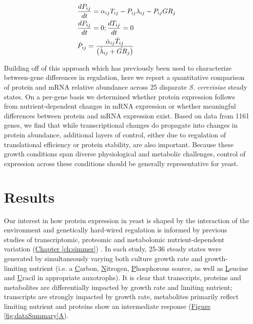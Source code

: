 \begin{align}
&\frac{dP_{ij}}{dt} = \alpha_{ij}T_{ij} - P_{ij}\lambda_{ij} - P_{ij}GR_{j}\notag\\
&\frac{dP_{ij}}{dt} = 0 ; \frac{dT_{ij}}{dt} = 0 \notag\\
&\dot{P}_{ij} = \frac{\dot{\alpha}_{ij}\dot{T}_{ij}}{\left(\dot{\lambda}_{ij} + \dot{GR}_{j}\right)}\label{steady_expression}
\end{align}


Building off of this approach which has previously been used to characterize between-gene differences in regulation, here we report a quantitative comparison of protein and mRNA relative abundance across 25 disparate \textit{S. cerevisiae} steady states.  On a per-gene basis we determined whether protein expression follows from nutrient-dependent changes in mRNA expression or whether meaningful differences between protein and mRNA expression exist.  Based on data from 1161 genes, we find that while transcriptional changes do propagate into changes in protein abundance, additional layers of control, either due to regulation of translational efficiency or protein stability, are also important. Because these growth conditions span diverse physiological and metabolic challenges, control of expression across these conditions should be generally representative for yeast.

\section{Results}

Our interest in how protein expression in yeast is shaped by the interaction of the environment and genetically hard-wired regulation is informed by previous studies of transcriptomic, proteomic and metabolomic nutrient-dependent variation (\hyperref[ch:simmer]{Chapter \ref{ch:simmer}}) \cite{Brauer:2008jn, Boer:2010fb}. In each study, 25-36 steady states were generated by simultaneously varying both culture growth rate and growth-limiting nutrient (i.e. a \underline{C}arbon, \underline{N}itrogen, \underline{P}hosphorous source, as well as \underline{L}eucine and \underline{U}racil in appropriate auxotrophs). It is clear that transcripts, proteins and metabolites are differentially impacted by growth rate and limiting nutrient; transcripts are strongly impacted by growth rate, metabolites primarily reflect limiting nutrient and proteins show an intermediate response (\hyperref[fig:dataSummary]{Figure \ref{fig:dataSummary}A}).

